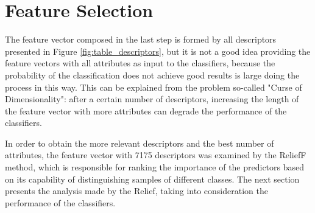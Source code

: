 \documentclass[conference]{IEEEtran}
\begin{document}
	\section{Feature Selection}
		The feature vector composed in the last step is formed by all descriptors presented in Figure \ref{fig:table_descriptors}, but it is not a good idea providing the feature vectors with all attributes as input to the classifiers, because the probability of the classification does not achieve good results is large doing the process in this way. This can be explained from the problem so-called "Curse of Dimensionality": after a certain number of descriptors, increasing the length of the feature vector with more attributes can degrade the performance of the classifiers.\par
		In order to obtain the more relevant descriptors and the best number of attributes, the feature vector with 7175 descriptors was examined by the ReliefF method, which is responsible for ranking the importance of the predictors based on its capability of distinguishing samples of different classes. The next section presents the analysis made by the Relief, taking into consideration the performance of the classifiers.
\end{document}
